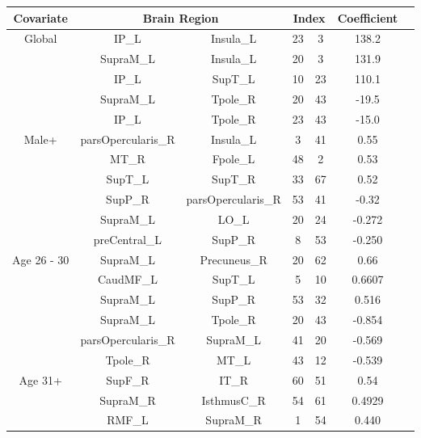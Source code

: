 \documentclass{article}
\begin{document}
\begin{table}
\begin{tabular}{c|cc|cc|c|c|}
Covariate&\multicolumn{2}{c|}{Brain Region}& \multicolumn{2}{c|}{Index}& Coefficient\\
\hline
\multirow{5}{*}{Global}&IP\_L&Insula\_L& 23&3&138.2\\
&SupraM\_L&Insula\_L&20&   3&131.9\\
&IP\_L&SupT\_L&10& 23&110.1\\
&SupraM\_L&Tpole\_R&20&43& -19.5\\
&IP\_L&Tpole\_R&23&43&-15.0\\
\hline 
\multirow{6}{*}{Male+}&parsOpercularis\_R&Insula\_L& 3&41&0.55\\
&MT\_R&Fpole\_L&48&2& 0.53\\
&SupT\_L&SupT\_R&33&67&0.52\\
&SupP\_R&parsOpercularis\_R&53&41&-0.32\\
&SupraM\_L&LO\_L& 20&24& -0.272\\
 &preCentral\_L&SupP\_R&8 &  53 &-0.250\\
\hline
\multirow{6}{*}{Age 26 - 30} &SupraM\_L&Precuneus\_R&20&62& 0.66\\
&CaudMF\_L&SupT\_L&5&10&0.6607\\
&SupraM\_L&SupP\_R&53   &32& 0.516\\
&SupraM\_L&Tpole\_R&20&43&-0.854\\
&parsOpercularis\_R&SupraM\_L&41&   20& -0.569\\
&Tpole\_R &MT\_L&43 &  12 &-0.539\\
\hline
\multirow{4}{*}{Age 31+} & SupF\_R&IT\_R&60  & 51&  0.54\\
&SupraM\_R&IsthmusC\_R&54 &  61&  0.4929\\
 &RMF\_L&SupraM\_R&1 &  54&  0.440\\
\end{tabular}
\end{table}
\end{document}
